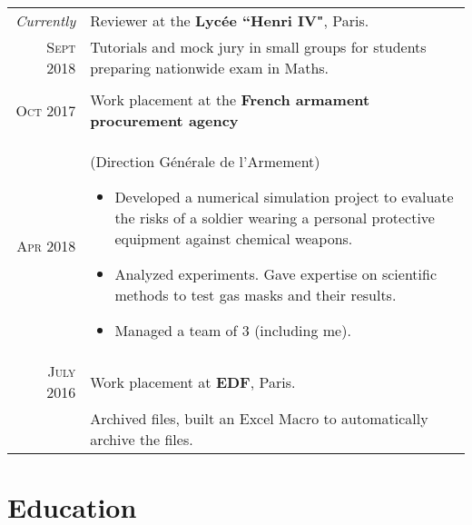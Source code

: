 \documentclass[a4paper,10pt]{article} %
\begin{document}
\begin{tabularx}{\linewidth}{r|X}
  \emph{Currently} & {\large Reviewer at the \textbf{Lycée ``Henri IV"}, Paris.}\\
  \textsc{Sept 2018} & \small{Tutorials and mock jury in small groups for students preparing nationwide exam in Maths.}
  \\&\\

\textsc{Oct 2017} & {\large Work placement at the \textbf{French armament procurement agency}}\\
\textsc{Apr 2018} & \small{(Direction Générale de l'Armement)
\begin{itemize}[noitemsep, nolistsep, leftmargin=0.5cm]
  \item Developed a numerical simulation project to evaluate the risks of a soldier wearing a personal protective equipment against chemical weapons.
  \item Analyzed experiments. Gave expertise on scientific methods to test gas masks and their results.
  \item Managed a team of 3 (including me).
\end{itemize}}\\


\textsc{July 2016} & {\large Work placement at \textbf{EDF}, Paris. }\\
& \small{Archived files, built an Excel Macro to automatically archive the files.}
\end{tabularx}


\section{Education}
\end{document}
